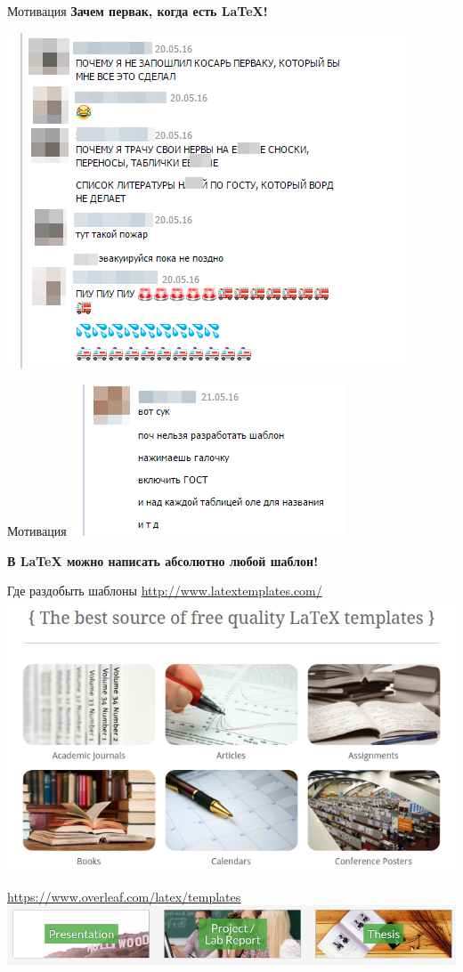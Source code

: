 \documentclass[newPxFont]{beamer}
\begin{document}
\begin{frame}{Мотивация}
    \centering
    \alert{\textbf{Зачем первак, когда есть \LaTeX{}!}}
    
    \includegraphics[height=0.68\textheight]{m4.png}
\end{frame}


\begin{frame}{Мотивация}
    \centering
    \includegraphics[scale=0.5]{m5.png}
    
    \vfill
    \alert{\textbf{В \LaTeX{} можно написать абсолютно любой шаблон!}}
\end{frame}


\begin{frame}{Где раздобыть шаблоны}
\centering
\url{http://www.latextemplates.com/}
\includegraphics[width=0.6\linewidth]{template1.png}	

\url{https://www.overleaf.com/latex/templates}
\includegraphics[width=\linewidth]{template2.png}	
\end{frame}
\end{document}
